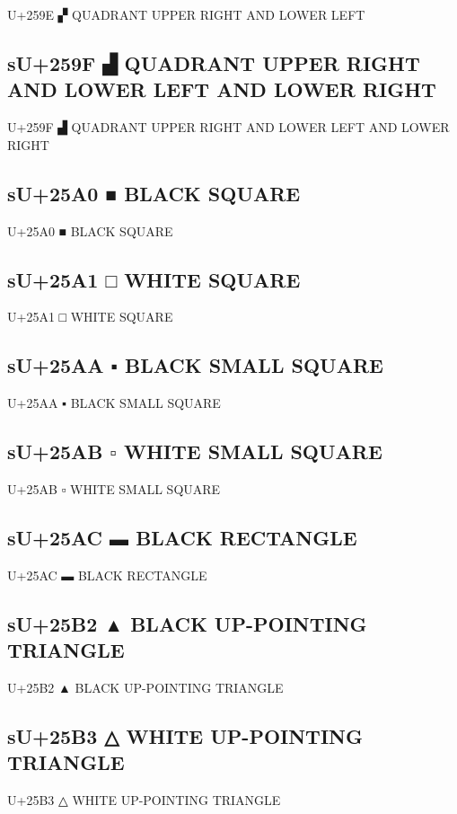 U+259E ▞ QUADRANT UPPER RIGHT AND LOWER LEFT

\subsection{sU+259F ▟ QUADRANT UPPER RIGHT AND LOWER LEFT AND LOWER RIGHT}

U+259F ▟ QUADRANT UPPER RIGHT AND LOWER LEFT AND LOWER RIGHT

\subsection{sU+25A0 ■ BLACK SQUARE}

U+25A0 ■ BLACK SQUARE

\subsection{sU+25A1 □ WHITE SQUARE}

U+25A1 □ WHITE SQUARE

\subsection{sU+25AA ▪ BLACK SMALL SQUARE}

U+25AA ▪ BLACK SMALL SQUARE

\subsection{sU+25AB ▫ WHITE SMALL SQUARE}

U+25AB ▫ WHITE SMALL SQUARE

\subsection{sU+25AC ▬ BLACK RECTANGLE}

U+25AC ▬ BLACK RECTANGLE

\subsection{sU+25B2 ▲ BLACK UP-POINTING TRIANGLE}

U+25B2 ▲ BLACK UP-POINTING TRIANGLE

\subsection{sU+25B3 △ WHITE UP-POINTING TRIANGLE}

U+25B3 △ WHITE UP-POINTING TRIANGLE

